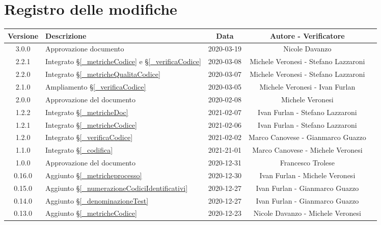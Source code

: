 \section*{Registro delle modifiche}

\begin{center}
	\begin{longtable}{|c|p{5cm}|c|c|c|}
		\hline
		\rowcolor{lighter-grayer}
		\textbf{Versione} & \textbf{Descrizione} & \textbf{Data} & \textbf{Autore - Verificatore} \\
		\hline
		\endfirsthead

		3.0.0 & Approvazione documento & 2020-03-19 & Nicole Davanzo \\
		2.2.1 & Integrato \S\ref{_metricheCodice} e \S\ref{_verificaCodice}& 2020-03-08 & Michele Veronesi - Stefano Lazzaroni \\
		2.2.0 & Integrato \S\ref{_metricheQualitaCodice} & 2020-03-07 & Michele Veronesi - Stefano Lazzaroni \\
		2.1.0 & Ampliamento \S\ref{_verificaCodice}  & 2020-03-05 & Michele Veronesi - Ivan Furlan  \\
		2.0.0 & Approvazione del documento & 2020-02-08 & Michele Veronesi \\
		1.2.2 & Integrato \S\ref{_metricheDoc} & 2021-02-07 & Ivan Furlan - Stefano Lazzaroni \\
		1.2.1 & Integrato \S\ref{_metricheCodice} & 2021-02-06 & Ivan Furlan - Stefano Lazzaroni \\
		1.2.0 & Integrato \S\ref{_verificaCodice} & 2021-02-02 & Marco Canovese - Gianmarco Guazzo \\
		1.1.0 & Integrato \S\ref{_codifica} & 2021-21-01 & Marco Canovese - Michele Veronesi \\
		1.0.0 & Approvazione del documento & 2020-12-31 & Francesco Trolese \\
		0.16.0 & Aggiunto \S\ref{_metricheprocesso} & 2020-12-30 & Ivan Furlan - Michele Veronesi \\
		0.15.0 & Aggiunto \S\ref{_numerazioneCodiciIdentificativi} & 2020-12-27 & Ivan Furlan - Gianmarco Guazzo \\
		0.14.0 & Aggiunto \S\ref{_denominazioneTest} & 2020-12-27 & Ivan Furlan - Gianmarco Guazzo  \\
		0.13.0 & %
		Aggiunto \S\ref{_metricheCodice} & 2020-12-23 & Nicole Davanzo - Michele Veronesi  \\
		

\end{longtable}
\end{center}
